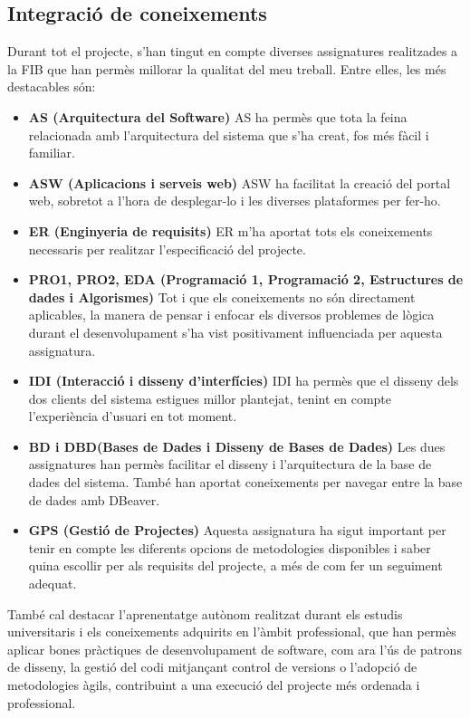 \documentclass[11pt,a4paper]{report}
\begin{document}
\subsection{Integració de coneixements}
Durant tot el projecte, s'han tingut en compte diverses assignatures realitzades a la FIB que han permès millorar la qualitat del meu treball. Entre elles, les més destacables són:
\begin{itemize}
    \item \textbf{AS (Arquitectura del Software)} AS ha permès que tota la feina relacionada amb l'arquitectura del sistema que s'ha creat, fos més fàcil i familiar.
    \item \textbf{ASW (Aplicacions i serveis web)} ASW ha facilitat la creació del portal web, sobretot a l'hora de desplegar-lo i les diverses plataformes per fer-ho.
    \item \textbf{ER (Enginyeria de requisits)} ER m'ha aportat tots els coneixements necessaris per realitzar l'especificació del projecte.
    \item \textbf{PRO1, PRO2, EDA (Programació 1, Programació 2, Estructures de dades i Algorismes)} Tot i que els coneixements no són directament aplicables, la manera de pensar i enfocar els diversos problemes de lògica durant el desenvolupament s'ha vist positivament influenciada per aquesta assignatura.
    \item \textbf{IDI (Interacció i disseny d'interfícies)} IDI ha permès que el disseny dels dos clients del sistema estigues millor plantejat, tenint en compte l'experiència d'usuari en tot moment.
    \item \textbf{BD i DBD(Bases de Dades i Disseny de Bases de Dades)} Les dues assignatures han permès facilitar el disseny i l'arquitectura de la base de dades del sistema. També han aportat coneixements per navegar entre la base de dades amb DBeaver.
    \item \textbf{GPS (Gestió de Projectes)} Aquesta assignatura ha sigut important per tenir en compte les diferents opcions de metodologies disponibles i saber quina escollir per als requisits del projecte, a més de com fer un seguiment adequat.
\end{itemize}

També cal destacar l'aprenentatge autònom realitzat durant els estudis universitaris i els coneixements adquirits en l'àmbit professional, que han permès aplicar bones pràctiques de desenvolupament de software, com ara l'ús de patrons de disseny, la gestió del codi mitjançant control de versions o l'adopció de metodologies àgils, contribuint a una execució del projecte més ordenada i professional.
\newpage
\end{document}
